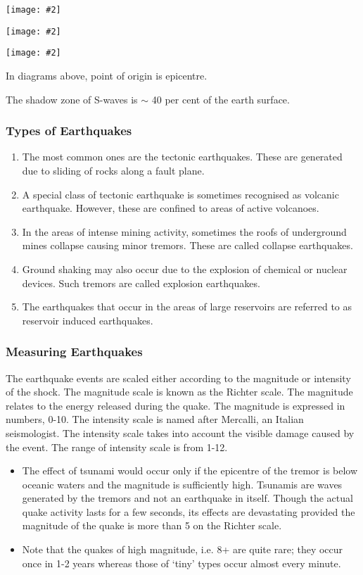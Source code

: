 \documentclass[8pt, a4paper, oneside, twocolumn]{extarticle}
\newcommand{\iph}[2]{
    \texttt{[image: \#2]}
}
\begin{document}
\iph{.2}{tc}

\iph{0.3}{psz}

\iph{0.3}{ssz}

In diagrams above, point of origin is epicentre.

The shadow zone of S-waves is $\sim$ 40 per cent of the earth surface.

\subsubsection{Types of Earthquakes}
\begin{enumerate}
  \item The most common ones are the tectonic earthquakes. These are generated due to sliding of rocks along a fault plane. 
  \item A special class of tectonic earthquake is sometimes recognised as volcanic earthquake. However, these are confined to areas of active volcanoes.
  \item In the areas of intense mining activity, sometimes the roofs of underground mines collapse causing minor tremors. These are called collapse earthquakes. 
  \item Ground shaking may also occur due to the explosion of chemical or nuclear devices. Such tremors are called explosion earthquakes. 
  \item The earthquakes that occur in the areas of large reservoirs are referred to as reservoir induced earthquakes.
\end{enumerate}

\subsubsection{Measuring Earthquakes}

The earthquake events are scaled either according to the magnitude or intensity of the shock. The magnitude scale is known as the Richter scale. The magnitude relates to the energy released during the quake. The magnitude is expressed in numbers, 0-10. The intensity scale is named after Mercalli, an Italian seismologist. The intensity scale takes into account the visible damage caused by the event. The range of intensity scale is from 1-12.

\begin{tcolorbox}
  \begin{itemize}
  \item The effect of tsunami would occur only if the epicentre of the tremor is below oceanic waters and the magnitude is sufficiently high. Tsunamis are waves generated by the tremors and not an earthquake in itself. Though the actual quake activity lasts for a few seconds, its effects are devastating provided the magnitude of the quake is more than 5 on the Richter scale.
  \item Note that the quakes of high
  magnitude, i.e. 8+ are quite rare; they occur
  once in 1-2 years whereas those of ‘tiny’ types
  occur almost every minute.
  \end{itemize}
\end{tcolorbox}
\end{document}
